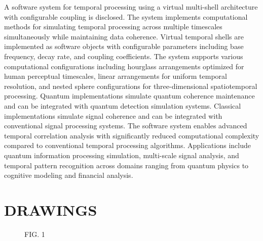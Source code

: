 \documentclass[12pt,letterpaper]{article}
\begin{document}
A software system for temporal processing using a virtual multi-shell architecture with configurable coupling is disclosed. The system implements computational methods for simulating temporal processing across multiple timescales simultaneously while maintaining data coherence. Virtual temporal shells are implemented as software objects with configurable parameters including base frequency, decay rate, and coupling coefficients. The system supports various computational configurations including hourglass arrangements optimized for human perceptual timescales, linear arrangements for uniform temporal resolution, and nested sphere configurations for three-dimensional spatiotemporal processing. Quantum implementations simulate quantum coherence maintenance and can be integrated with quantum detection simulation systems. Classical implementations simulate signal coherence and can be integrated with conventional signal processing systems. The software system enables advanced temporal correlation analysis with significantly reduced computational complexity compared to conventional temporal processing algorithms. Applications include quantum information processing simulation, multi-scale signal analysis, and temporal pattern recognition across domains ranging from quantum physics to cognitive modeling and financial analysis.

\newpage
\section*{DRAWINGS}

\begin{figure}[h]
\centering
{}
\caption*{FIG. 1}
\end{figure}
\end{document}
